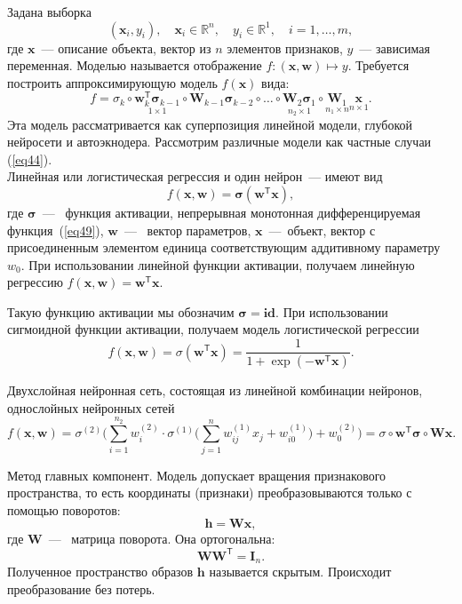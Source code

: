 \documentclass[12pt, twoside]{article}
\newcommand{\xb}{{\mathbf{x}}}
\newcommand{\sigmab}{{\boldsymbol{\sigma}}}
\newenvironment{comment}{}{}
\newcommand{\x}{{\mathbf{x}}}
\newcommand{\w}{{\mathbf{W}}}
\newcommand{\wm}{{\mathbf{w}}}
\begin{document}
\begin{comment}
Задана выборка 
\begin{equation}\label{eq3}
(\xb_i,y_i),\quad \xb_i \in \mathbb{R}^n,\quad y_i\in \mathbb{R}^1,\quad i=1,\dots,m,
\end{equation}
где $\xb$~--- описание объекта, вектор из $n$ элементов признаков, $y$~--- зависимая переменная. Моделью называется отображение $f:(\xb,\wm)\mapsto y$. Требуется построить аппроксимирующую модель $f(\x)$ вида:
\begin{equation}\label{eq44}
f = \sigma_k\circ\underset{1\times1}{\wm_k^\mathsf{T}\sigmab_{k-1}}\circ\w_{k-1}\sigmab_{k-2}\circ\dots\circ\underset{n_2 \times 1}{\w_2\sigmab_1}\circ\underset{n_1 \times n}{\w_1}\underset{n \times 1}{\x}.
\end{equation}
Эта модель рассматривается как суперпозиция линейной модели, глубокой нейросети и автоэкнодера. Рассмотрим различные модели как частные случаи (\ref{eq44}).
\\
Линейная или логистическая регрессия и один нейрон~--- имеют вид
\begin{equation}\label{eq11}
f(\xb,\wm)=\sigmab(\wm^\mathsf{T}\xb),
\end{equation}
где $\sigmab$~---~ функция активации, непрерывная монотонная дифференцируемая функция~(\ref{eq49}),  $\wm$~---~ вектор параметров, $\xb$~---~объект, вектор с присоединенным элементом единица соответствующим аддитивному параметру $w_0$. При использовании линейной функции активации,  получаем линейную регрессию $f(\xb,\wm)=\wm^\mathsf{T}\xb.$

Такую функцию активации мы обозначим $\sigmab = \textbf{id} $. При использовании сигмоидной функции активации,  получаем модель логистической регрессии \begin{equation}\label{eq49}
f(\xb,\wm)=\sigma(\wm^\mathsf{T}\xb)=\frac{1}{1+\exp(-\wm^\mathsf{T}\xb)} .
\end{equation}

Двухслойная нейронная сеть, состоящая из линейной комбинации нейронов, однослойных нейронных сетей
\begin{equation}\label{eq12}
f(\xb,\wm)=\sigma^{(2)}\bigg(\sum_{i=1}^{n_2}w_i^{(2)}\cdot\sigma^{(1)}\Bigg(\sum_{j=1}^{n}w_{ij}^{(1)}x_j+w_{i0}^{(1)}\Bigg)+w_0^{(2)}\bigg) = \sigma\circ \wm^{\mathsf{T}}\sigmab\circ \w\xb.
\end{equation}

Метод главных компонент. Модель допускает вращения признакового пространства, то есть координаты (признаки) преобразовываются только с помощью поворотов:
\begin{equation}
\mathbf{h} = \w\x,
\end{equation}
где $\w$~---~ матрица поворота. Она ортогональна: 
\begin{equation}\label{eq51}
\w\w^\mathsf{T} = \mathbf{I}_n.
\end{equation}
Полученное пространство образов $\mathbf{h}$ называется скрытым. Происходит преобразование без потерь.


\end{comment}
\end{document}
